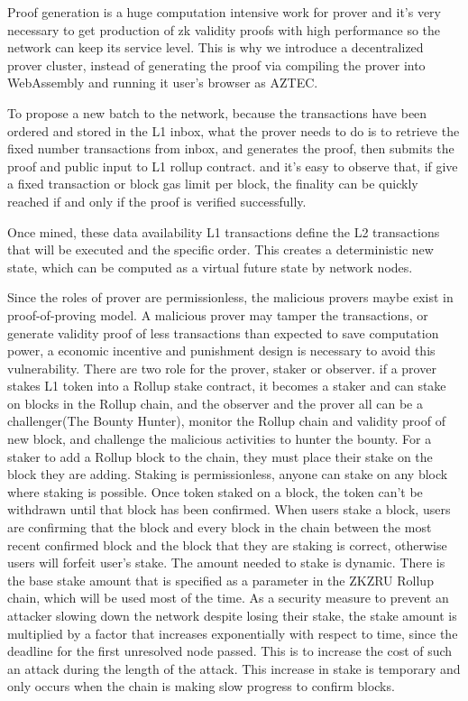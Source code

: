 \documentclass{article}
\begin{document}
Proof generation is a huge computation intensive work for prover and it's very necessary to get production of zk validity proofs with high performance so the network can keep its service level. This is why we introduce a decentralized prover cluster, instead of generating the proof via compiling the prover into WebAssembly and running it user's browser as AZTEC.

To propose a new batch to the network, because the transactions have been ordered and stored in the L1 inbox, what the prover needs to do is to retrieve the fixed number transactions from inbox, and generates the proof, then submits the proof and public input to L1 rollup contract. and it's easy to observe that, if give a fixed transaction or block gas limit per block, the finality can be quickly reached if and only if the proof is verified successfully.

Once mined, these data availability L1 transactions define the L2 transactions that will be executed and the specific order. This creates a deterministic new state, which can be computed as a virtual future state by network nodes.

Since the roles of prover are permissionless, the malicious provers maybe exist in proof-of-proving model. A malicious prover may tamper the transactions, or generate validity proof of less transactions than expected to save computation power, a economic incentive and punishment design is necessary to avoid this vulnerability. There are two role for the prover, staker or observer. if a prover stakes L1 token into a Rollup stake contract, it becomes a staker and can stake on blocks in the Rollup chain, and the observer and the prover all can be a challenger(The Bounty Hunter), monitor the Rollup chain and validity proof 
of new block, and challenge the malicious activities to hunter the bounty. For a staker to add a Rollup block to the chain, they must place their stake on the block they are adding. Staking is permissionless, anyone can stake on any block where staking is possible. Once token staked on a block, the token can't be withdrawn until that block has been confirmed. When users stake a block, users are confirming that the block and every block in the chain between the most recent confirmed block and the block that they are staking is correct, otherwise users will forfeit user's stake. The amount needed to stake is dynamic. There is the base stake amount that is specified as a parameter in the ZKZRU Rollup chain, which will be used most of the time. As a security measure to prevent an attacker slowing down the network despite losing their stake, the stake amount is multiplied by a factor that increases exponentially with respect to time, since the deadline for the first unresolved node passed. This is to increase the cost of such an attack during the length of the attack. This increase in stake is temporary and only occurs when the chain is making slow progress to confirm blocks.
\end{document}
